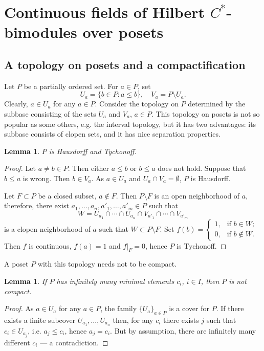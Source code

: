 \documentclass[12pt]{amsart}
\newtheorem{lem}[thm]{Lemma}
\theoremstyle{definition}
\begin{document}
\section{Continuous fields of Hilbert $C^*$-bimodules over posets}

\subsection{A topology on posets and a compactification}

Let $P$ be a partially ordered set. For $a\in P$, set 
$$
U_a=\{b\in P:a\leq b\},\quad V_a=P\setminus U_a. 
$$
Clearly, $a\in U_a$ for any $a\in P$. Consider the topology on $P$ determined by the subbase consisting of the sets $U_a$ and $V_a$, $a\in P$. This topology on posets is not so popular as some others, e.g. the interval topology, but it has two advantages: its subbase consists of clopen sets, and it has nice separation properties.

\begin{lem}
$P$ is Hausdorff and Tychonoff.

\end{lem}
\begin{proof}
Let $a\neq b\in P$. Then either $a\leq b$ or $b\leq a$ does not hold. Suppose that $b\leq a$ is wrong. Then $b\in V_a$. As $a\in U_a$ and $U_a\cap V_a=\emptyset$, $P$ is Hausdorff. 

Let $F\subset P$ be a closed subset, $a\notin F$. Then $P\setminus F$ is an open neighborhood of $a$, therefore, there exist $a_1,\ldots,a_n,a'_1,\ldots,a'_m\in P$ such that 
$$
W=U_{a_1}\cap\cdots\cap U_{a_n}\cap V_{a'_1}\cap\cdots\cap V_{a'_m}
$$ 
is a clopen neighborhood of $a$ such that $W\subset P\setminus F$. Set $f(b)=\left\lbrace\begin{array}{cl}1,&\mbox{if\ }b\in W;\\0,&\mbox{if\ }b\notin W.\end{array}\right.$ Then $f$ is continuous, $f(a)=1$ and $f|_F=0$, hence $P$ is Tychonoff.
 \end{proof}

A poset $P$ with this topology needs not to be compact. 

\begin{lem}\label{lem:noncompact} 
If $P$ has infinitely many minimal elements $c_i$, $i\in I$, then $P$ is not compact.  

\end{lem}
\begin{proof}
As $a\in U_a$ for any $a\in P$, the family $\{U_a\}_{a\in P}$ is a cover for $P$. If there exists a finite subcover $U_{a_1},\ldots, U_{a_n}$ then, for any $c_i$ there exists $j$ such that $c_i\in U_{a_j}$, i.e. $a_j\leq c_i$, hence $a_j=c_i$. But by assumption, there are infinitely many different $c_i$ --- a contradiction.  
\end{proof}
\end{document}
